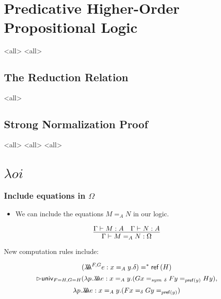 
\section{Predicative Higher-Order Propositional Logic}

\mode<all>{}
\mode<all>{}

\subsection{The Reduction Relation}

\mode<all>{}

\subsection{Strong Normalization Proof}

\mode<all>{}
\mode<all>{}
\mode<all>{}

\section{$\lambda o i$}

\begin{frame}
\frametitle{Include equations in $\Omega$}

\begin{itemize}
\item
We can include the equations $M =_A N$ in our logic.
\end{itemize}

\[ \infer{\Gamma \vdash M =_A N : \Omega}{\Gamma \vdash M : A \quad \Gamma \vdash N : A} \]

\pause

New computation rules include:

\[ (\lambda \!\! \lambda \!\! \lambda^{F,G} e:x =_A y . \delta) =^* \mathsf{ref} \left( {H} \right) \]
\[ \rhd \mathsf{univ}_{F = H,G = H}(\lambda p. \lambda \!\! \lambda \!\! \lambda e:x=_Ay. (Gx =_{sym\ \delta} F y =_{p \mathsf{ref} \left( {y} \right)} H y), \]
\[ \lambda p. \lambda \!\! \lambda \!\! \lambda e:x=_A y. (F x =_{\delta} G y =_{p \mathsf{ref} \left( {y} \right)}) \]
\end{frame}

